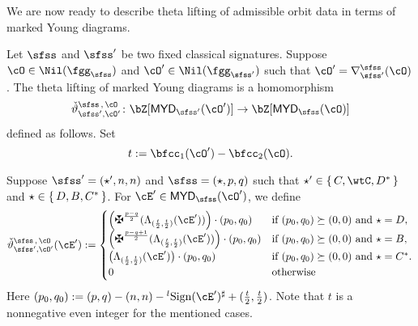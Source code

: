 \documentclass[12pt,a4paper]{amsart}
\def\MYD{{\mathsf{MYD}}}
\def\abs#1{\left|{#1}\right|}
\numberwithin{equation}{section}
\theoremstyle{remark}
\def\lsign{{}^l\mathrm{Sign}}
\begin{document}
\medskip





\def\cEp{\cE'}
\def\dliftso{{\check \vartheta}_{\sfss',\cO'}^{\sfss\,,\,\cO}}

We are now ready to describe theta lifting of admissible orbit data in terms of marked Young diagrams.

Let $\sfss$ and $\sfss'$ be two fixed classical signatures.
Suppose $\cO\in \Nil(\fggs)$ and $\cO'\in \Nil(\fggsp)$ such that
$\cO'= \DDss(\cO)$.
The theta lifting of marked Young diagrams is a homomorphism
\[
  \dliftso \colon \bZ[\MYD_{\sfss'}(\cO')]\rightarrow \bZ[\MYD_{\sfss}(\cO)]
\]
defined as follows. Set
\[
  t := \bfcc_{1}(\cO')-\bfcc_{2}(\cO).
\]

\medskip

Suppose $\sfss'=(\star',n,n)$ and $\sfss =(\star,p,q)$ such that
$\star'\in \set{ C,\wtC, D^{*}}$  and $\star \in \set{D,B, C^{*}}$.
For $\cEp\in \MYD_{\sfss}(\cO')$, we define
\begin{equation}\label{eq:LCD}
  \dliftso(\cEp) :=
  \begin{cases}
    \left(\maltese^{\frac{p-q}{2}}(\Lambda_{(\frac{t}{2},\frac{t}{2})}( \cEp))\right)\cdot (p_{0},q_{0}) &
    \text{if } ( p_{0},q_{0} ) \succeq (0,0) \text{ and } \star=D, \\
    \left(\maltese^{\frac{p-q+1}{2}}(\Lambda_{(\frac{t}{2},\frac{t}{2})}( \cEp))\right)\cdot (p_{0},q_{0}) &
    \text{if } ( p_{0},q_{0} ) \succeq (0,0) \text{ and } \star=B, \\
    \big(\Lambda_{(\frac{t}{2},\frac{t}{2})}( \cEp)\big)\cdot (p_{0},q_{0}) &
    \text{if } ( p_{0},q_{0} ) \succeq (0,0) \text{ and } \star=C^{*}. \\
    0 & \text{otherwise}
  \end{cases}
\end{equation}
Here $(p_{0}, q_{0})  := (p,q) -(n,n)-\lsign(\cEp)^{\sharp} + (\frac{t}{2},\frac{t}{2})$. Note that $t$ is a nonnegative even integer for the mentioned cases.
\end{document}
